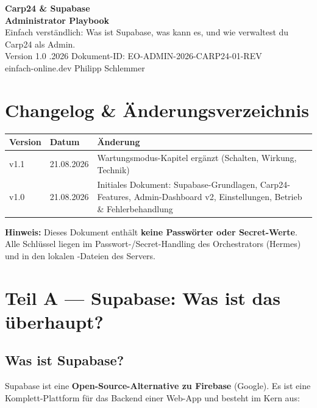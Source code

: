 \documentclass[11pt, a4paper]{article}
\newcommand{\code}[1]{\colorbox{codebg}{\texttt{\small\detokenize{#1}}}}
\begin{document}
\begin{center}
    \vspace*{1.0cm}
    {\color{eopurple}\Huge\bfseries Carp24 \& Supabase}\\[0.4cm]
    {\color{eocyan}\Large\bfseries Administrator Playbook}\\[0.3cm]
    {\large Einfach verständlich: Was ist Supabase, was kann es, und wie verwaltest du Carp24 als Admin.}\\[0.8cm]
    {\normalsize Version 1.0 \quad\textbar{}.2026 \quad\textbar\quad Dokument-ID: EO-ADMIN-2026-CARP24-01-REV}\\[0.3cm]
    {\normalsize einfach-online.dev \quad\textbar\quad Philipp Schlemmer}
    \vspace*{1.0cm}
\end{center}

\tableofcontents
\newpage

\section{Changelog \& Änderungsverzeichnis}

\begin{tabularx}{\textwidth}{llX}
\toprule
\textbf{Version} & \textbf{Datum} & \textbf{Änderung} \\
\midrule
v1.1 & 21.08.2026 & Wartungsmodus-Kapitel ergänzt (Schalten, Wirkung, Technik) \\
v1.0 & 21.08.2026 & Initiales Dokument: Supabase-Grundlagen, Carp24-Features, Admin-Dashboard v2, Einstellungen, Betrieb \& Fehlerbehandlung \\
\bottomrule
\end{tabularx}

\textbf{Hinweis:} Dieses Dokument enthält \textbf{keine Passwörter oder Secret-Werte}. Alle Schlüssel liegen im Passwort-/Secret-Handling des Orchestrators (Hermes) und in den lokalen \code{.env}-Dateien des Servers.

\newpage

\section{Teil A — Supabase: Was ist das überhaupt?}

\subsection{Was ist Supabase?}
Supabase ist eine \textbf{Open-Source-Alternative zu Firebase} (Google). Es ist eine Komplett-Plattform für das Backend einer Web-App und besteht im Kern aus:
\end{document}
